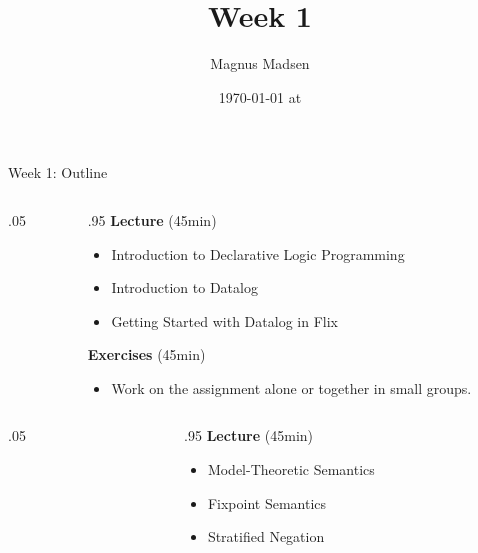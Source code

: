 

\title{Week 1}
\date{\today{} at \currenttime{}}
\author{Magnus Madsen}



\maketitle

\begin{frame}{Week 1: Outline}
\begin{columns}
\begin{column}{.05\textwidth}
\end{column}
\begin{column}{.95\textwidth}
    \footnotesize
\textbf{Lecture} (45min)  \vspace{-2mm}
\begin{itemize}
    \setlength\itemsep{-0.5em}
    \item Introduction to Declarative Logic Programming
    \item Introduction to Datalog
    \item Getting Started with Datalog in Flix
\end{itemize}
\textbf{Exercises} (45min) \vspace{-2mm}
\begin{itemize}
    \item Work on the assignment alone or together in small groups.
\end{itemize}
\end{column}
\end{columns}

\medskip
\medskip
\medskip

\color{gray}
\begin{columns}
\begin{column}{.05\textwidth}
\end{column}
\begin{column}{.95\textwidth}
\footnotesize
\textbf{Lecture} (45min) \vspace{-2mm}
\begin{itemize}
    \color{gray}
    \setlength\itemsep{-0.5em}
    \item Model-Theoretic Semantics
    \item Fixpoint Semantics
    \item Stratified Negation
\end{itemize}
\end{column}
\end{columns}
\end{frame}

